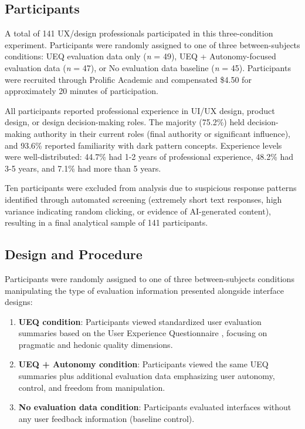 
\subsection{Participants}

A total of 141 UX/design professionals participated in this three-condition experiment. Participants were randomly assigned to one of three between-subjects conditions: UEQ evaluation data only (\textit{n} = 49), UEQ + Autonomy-focused evaluation data (\textit{n} = 47), or No evaluation data baseline (\textit{n} = 45). Participants were recruited through Prolific Academic and compensated \$4.50 for approximately 20 minutes of participation. 

All participants reported professional experience in UI/UX design, product design, or design decision-making roles. The majority (75.2\%) held decision-making authority in their current roles (final authority or significant influence), and 93.6\% reported familiarity with dark pattern concepts. Experience levels were well-distributed: 44.7\% had 1-2 years of professional experience, 48.2\% had 3-5 years, and 7.1\% had more than 5 years.

Ten participants were excluded from analysis due to suspicious response patterns identified through automated screening (extremely short text responses, high variance indicating random clicking, or evidence of AI-generated content), resulting in a final analytical sample of 141 participants.

\subsection{Design and Procedure}

Participants were randomly assigned to one of three between-subjects conditions manipulating the type of evaluation information presented alongside interface designs:

\begin{enumerate}
\item \textbf{UEQ condition}: Participants viewed standardized user evaluation summaries based on the User Experience Questionnaire \cite{laugwitz2008construction}, focusing on pragmatic and hedonic quality dimensions.
\item \textbf{UEQ + Autonomy condition}: Participants viewed the same UEQ summaries plus additional evaluation data emphasizing user autonomy, control, and freedom from manipulation.
\item \textbf{No evaluation data condition}: Participants evaluated interfaces without any user feedback information (baseline control).
\end{enumerate}

